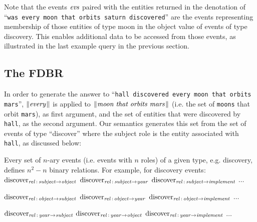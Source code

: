 \documentclass[../main.tex]{subfiles}
\begin{document}
\begin{refsection}


Note that the events $\evs$ paired with the entities returned in the denotation of ``\texttt{was every moon that orbits saturn discovered}'' are the events representing membership of those entities of type moon in the object value of events of type discovery. This enables additional data to be accessed from those events, as illustrated in the last example query in the previous section.

\subsection{The FDBR}

In order to generate the  answer to ``\texttt{hall discovered every moon that orbits mars}'', $\meaningof{every}$ is applied to $\meaningof{moon\ that\ orbits\ mars}$ (i.e. the set of \texttt{moons} that orbit \texttt{mars}), as first argument, and  the set of entities  that were discovered by \texttt{hall}, as the second argument. Our semantics generates this set from the set of events of type ``discover'' where the subject role is the entity associated with \texttt{hall}, as discussed below:

\noindent Every set of $n$-ary events (i.e. events with $n$ roles) of a given type, e.g. discovery, defines $n^2 - n$ binary relations. For example, for discovery events: \\

\noindent $\relationn{discover}{subject}{object}$ $\relationn{discover}{subject}{year}$ $\relationn{discover}{subject}{implement}$ $\dots$

\noindent $\relationn{discover}{object}{subject}$ $\relationn{discover}{object}{year}$ $\relationn{discover}{object}{implement}$ $\dots$

\noindent $\relationn{discover}{year}{subject}$ $\relationn{discover}{year}{object}$ $\relationn{discover}{year}{implement}$ $\dots$ \\


\end{refsection}
\end{document}
